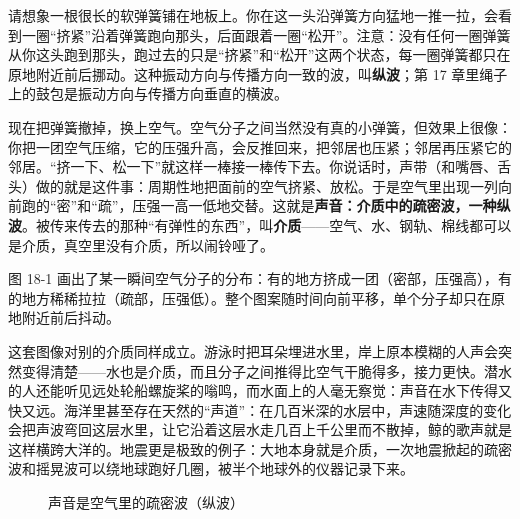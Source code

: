\begin{mainline}
请想象一根很长的软弹簧铺在地板上。你在这一头沿弹簧方向猛地一推一拉，会看到一圈“挤紧”沿着弹簧跑向那头，后面跟着一圈“松开”。注意：没有任何一圈弹簧从你这头跑到那头，跑过去的只是“挤紧”和“松开”这两个状态，每一圈弹簧都只在原地附近前后挪动。这种振动方向与传播方向一致的波，叫\textbf{纵波}；第 17 章里绳子上的鼓包是振动方向与传播方向垂直的横波。

现在把弹簧撤掉，换上空气。空气分子之间当然没有真的小弹簧，但效果上很像：你把一团空气压缩，它的压强升高，会反推回来，把邻居也压紧；邻居再压紧它的邻居。“挤一下、松一下”就这样一棒接一棒传下去。你说话时，声带（和嘴唇、舌头）做的就是这件事：周期性地把面前的空气挤紧、放松。于是空气里出现一列向前跑的“密”和“疏”，压强一高一低地交替。这就是\textbf{声音：介质中的疏密波，一种纵波}。被传来传去的那种“有弹性的东西”，叫\textbf{介质}——空气、水、钢轨、棉线都可以是介质，真空里没有介质，所以闹铃哑了。

图 18-1 画出了某一瞬间空气分子的分布：有的地方挤成一团（密部，压强高），有的地方稀稀拉拉（疏部，压强低）。整个图案随时间向前平移，单个分子却只在原地附近前后抖动。

这套图像对别的介质同样成立。游泳时把耳朵埋进水里，岸上原本模糊的人声会突然变得清楚——水也是介质，而且分子之间推得比空气干脆得多，接力更快。潜水的人还能听见远处轮船螺旋桨的嗡鸣，而水面上的人毫无察觉：声音在水下传得又快又远。海洋里甚至存在天然的“声道”：在几百米深的水层中，声速随深度的变化会把声波弯回这层水里，让它沿着这层水走几百上千公里而不散掉，鲸的歌声就是这样横跨大洋的。地震更是极致的例子：大地本身就是介质，一次地震掀起的疏密波和摇晃波可以绕地球跑好几圈，被半个地球外的仪器记录下来。
\end{mainline}

\begin{figure}[htbp]
\centering
{}
\caption{声音是空气里的疏密波（纵波）}
\end{figure}

